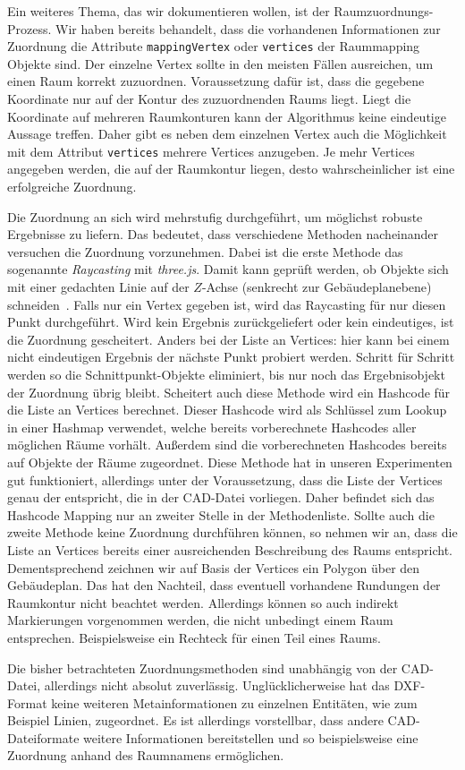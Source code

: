 Ein weiteres Thema, das wir dokumentieren wollen, ist der Raumzuordnungs-Prozess.
Wir haben bereits behandelt, dass die vorhandenen Informationen zur Zuordnung die Attribute \texttt{mappingVertex} oder \texttt{vertices} der Raummapping Objekte sind.
Der einzelne Vertex sollte in den meisten Fällen ausreichen, um einen Raum korrekt zuzuordnen.
Voraussetzung dafür ist, dass die gegebene Koordinate nur auf der Kontur des zuzuordnenden Raums liegt.
Liegt die Koordinate auf mehreren Raumkonturen kann der Algorithmus keine eindeutige Aussage treffen.
Daher gibt es neben dem einzelnen Vertex auch die Möglichkeit mit dem Attribut \texttt{vertices} mehrere Vertices anzugeben.
Je mehr Vertices angegeben werden, die auf der Raumkontur liegen, desto wahrscheinlicher ist eine erfolgreiche Zuordnung.

Die Zuordnung an sich wird mehrstufig durchgeführt, um möglichst robuste Ergebnisse zu liefern.
Das bedeutet, dass verschiedene Methoden nacheinander versuchen die Zuordnung vorzunehmen.
Dabei ist die erste Methode das sogenannte \textit{Raycasting} mit \textit{three.js}.
Damit kann geprüft werden, ob Objekte sich mit einer gedachten Linie auf der \(Z\)-Achse (senkrecht zur Gebäudeplanebene) schneiden~\cite{Raycaster}.
Falls nur ein Vertex gegeben ist, wird das Raycasting für nur diesen Punkt durchgeführt.
Wird kein Ergebnis zurückgeliefert oder kein eindeutiges, ist die Zuordnung gescheitert.
Anders bei der Liste an Vertices: hier kann bei einem nicht eindeutigen Ergebnis der nächste Punkt probiert werden.
Schritt für Schritt werden so die Schnittpunkt-Objekte eliminiert, bis nur noch das Ergebnisobjekt der Zuordnung übrig bleibt.
Scheitert auch diese Methode wird ein Hashcode für die Liste an Vertices berechnet.
Dieser Hashcode wird als Schlüssel zum Lookup in einer Hashmap verwendet, welche bereits vorberechnete Hashcodes aller möglichen Räume vorhält.
Außerdem sind die vorberechneten Hashcodes bereits auf Objekte der Räume zugeordnet.
Diese Methode hat in unseren Experimenten gut funktioniert, allerdings unter der Voraussetzung, dass die Liste der Vertices genau der entspricht, die in der CAD-Datei vorliegen.
Daher befindet sich das Hashcode Mapping nur an zweiter Stelle in der Methodenliste.
Sollte auch die zweite Methode keine Zuordnung durchführen können, so nehmen wir an, dass die Liste an Vertices bereits einer ausreichenden Beschreibung des Raums entspricht.
Dementsprechend zeichnen wir auf Basis der Vertices ein Polygon über den Gebäudeplan.
Das hat den Nachteil, dass eventuell vorhandene Rundungen der Raumkontur nicht beachtet werden.
Allerdings können so auch indirekt Markierungen vorgenommen werden, die nicht unbedingt einem Raum entsprechen.
Beispielsweise ein Rechteck für einen Teil eines Raums.

Die bisher betrachteten Zuordnungsmethoden sind unabhängig von der CAD-Datei, allerdings nicht absolut zuverlässig.
Unglücklicherweise hat das DXF-Format keine weiteren Metainformationen zu einzelnen \glqq{}Entitäten\grqq{}, wie zum Beispiel Linien, zugeordnet.
Es ist allerdings vorstellbar, dass andere CAD-Dateiformate weitere Informationen bereitstellen und so beispielsweise eine Zuordnung anhand des Raumnamens ermöglichen.
